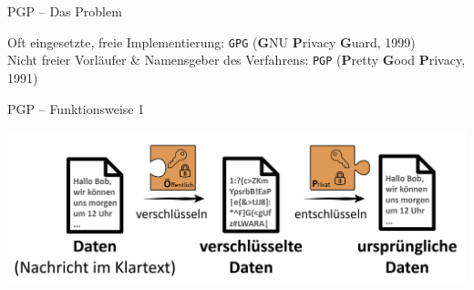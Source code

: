 \documentclass{beamer}
\begin{document}
\begin{frame}{PGP – Das Problem}
  \pause

  {\tiny Oft eingesetzte, freie Implementierung: \texttt{GPG} (\textbf{G}NU \textbf{P}rivacy \textbf{G}uard, 1999)\\
  Nicht freier Vorläufer \& Namensgeber des Verfahrens: \texttt{PGP} (\textbf{P}retty \textbf{G}ood \textbf{P}rivacy, 1991)}


\end{frame}


\begin{frame}{PGP – Funktionsweise 1}

\begin{center}
\includegraphics[width=\textwidth]{img-src/pgp_ver_entschluesseln.png}
\end{center}
\end{frame}

\end{document}
